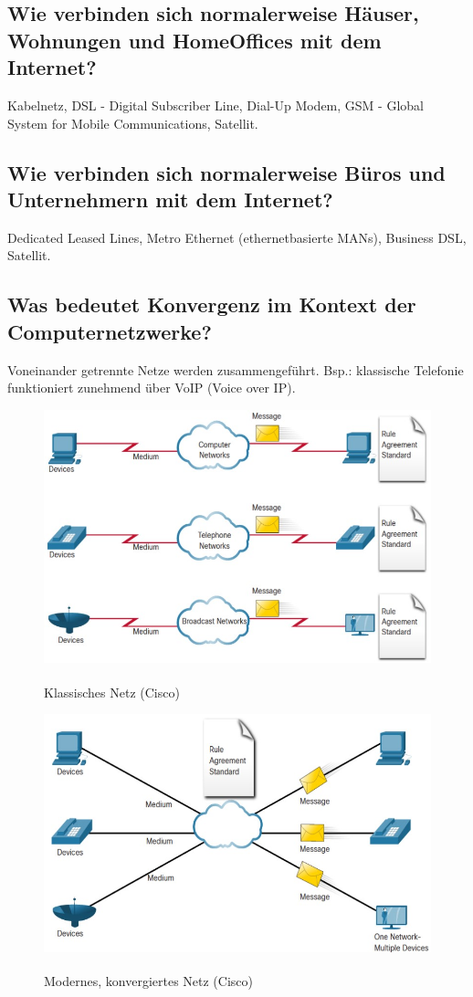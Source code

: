 \subsection*{Wie verbinden sich normalerweise Häuser, Wohnungen und HomeOffices mit dem Internet?}
Kabelnetz, DSL - Digital Subscriber Line, Dial-Up Modem, GSM - Global System for Mobile Communications, Satellit.
\subsection*{Wie verbinden sich normalerweise Büros und Unternehmern mit dem Internet?}
Dedicated Leased Lines, Metro Ethernet (ethernetbasierte MANs), Business DSL, Satellit.
\subsection*{Was bedeutet Konvergenz im Kontext der Computernetzwerke?}
Voneinander getrennte Netze werden zusammengeführt. Bsp.: klassische Telefonie funktioniert zunehmend über VoIP (Voice over IP).

\begin{figure}[H]
    \begin{center}
    \label{pic:converging_classic}
    \includegraphics[width=.6\textwidth]{images/converging_network_classic.jpg}
    \caption{Klassisches Netz (\textsuperscript{\textcopyright}Cisco)}
    \end{center}
\end{figure}
\begin{figure}[H]
    \begin{center}
    \label{pic:converging_modern}
    \includegraphics[width=.6\textwidth]{images/converging_network_modern.jpg}
    \caption{Modernes, konvergiertes Netz (\textsuperscript{\textcopyright}Cisco)}
    \end{center}
\end{figure}
